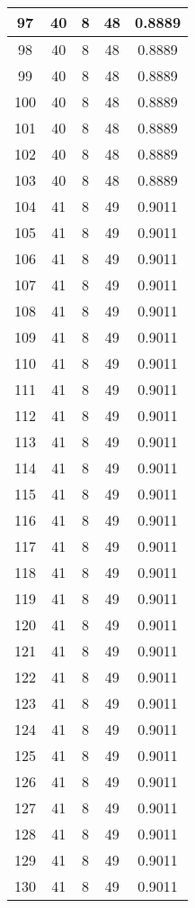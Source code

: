 \documentclass[letterpaper, 12pt]{article}
\begin{document}
\begin{longtable}{|c|c|c|c|c|}
\hline
97 & 40 & 8 & 48 & 0.8889 \\
\hline
98 & 40 & 8 & 48 & 0.8889 \\
\hline
99 & 40 & 8 & 48 & 0.8889 \\
\hline
100 & 40 & 8 & 48 & 0.8889 \\
\hline
101 & 40 & 8 & 48 & 0.8889 \\
\hline
102 & 40 & 8 & 48 & 0.8889 \\
\hline
103 & 40 & 8 & 48 & 0.8889 \\
\hline
104 & 41 & 8 & 49 & 0.9011 \\
\hline
105 & 41 & 8 & 49 & 0.9011 \\
\hline
106 & 41 & 8 & 49 & 0.9011 \\
\hline
107 & 41 & 8 & 49 & 0.9011 \\
\hline
108 & 41 & 8 & 49 & 0.9011 \\
\hline
109 & 41 & 8 & 49 & 0.9011 \\
\hline
110 & 41 & 8 & 49 & 0.9011 \\
\hline
111 & 41 & 8 & 49 & 0.9011 \\
\hline
112 & 41 & 8 & 49 & 0.9011 \\
\hline
113 & 41 & 8 & 49 & 0.9011 \\
\hline
114 & 41 & 8 & 49 & 0.9011 \\
\hline
115 & 41 & 8 & 49 & 0.9011 \\
\hline
116 & 41 & 8 & 49 & 0.9011 \\
\hline
117 & 41 & 8 & 49 & 0.9011 \\
\hline
118 & 41 & 8 & 49 & 0.9011 \\
\hline
119 & 41 & 8 & 49 & 0.9011 \\
\hline
120 & 41 & 8 & 49 & 0.9011 \\
\hline
121 & 41 & 8 & 49 & 0.9011 \\
\hline
122 & 41 & 8 & 49 & 0.9011 \\
\hline
123 & 41 & 8 & 49 & 0.9011 \\
\hline
124 & 41 & 8 & 49 & 0.9011 \\
\hline
125 & 41 & 8 & 49 & 0.9011 \\
\hline
126 & 41 & 8 & 49 & 0.9011 \\
\hline
127 & 41 & 8 & 49 & 0.9011 \\
\hline
128 & 41 & 8 & 49 & 0.9011 \\
\hline
129 & 41 & 8 & 49 & 0.9011 \\
\hline
130 & 41 & 8 & 49 & 0.9011 \\

\end{longtable}
\end{document}
